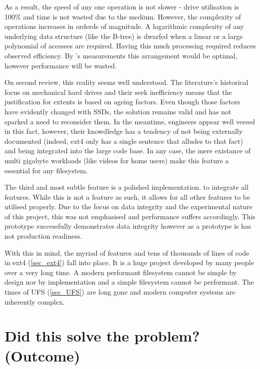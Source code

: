         As a result, the speed of any one operation is not slower - drive
        utilisation is 100\% and time is not wasted due to the medium. However,
        the complexity of operations increases in orderds of magnitude. A
        logarithmic complexity of any underlying data structure (like the
        B-tree) is dwarfed when a linear or a large polynomial of accesses are
        required. Having this much processing required reduces observed
        efficiency. By \citeauthor{FFS}'s measurements this arrangement would
        be optimal, however performance will be wasted.

        On second review, this reality seems well understood. The literature's
        historical focus on mechanical hard drives and their seek inefficiency
        means that the justification for extents is based on ageing factors.
        Even though those factors have evidently changed with SSDs, the
        solution remains valid and has not sparked a need to reconsider them.
        In the meantime, engineers appear well versed in this fact, however,
        their knowdledge has a tendency of not being externally documented
        (indeed, ext4 only has a single sentence that alludes to that fact) and
        being integrated into the large code base. In any case, the mere
        existance of multi gigabyte workloads (like videos for home users) make
        this feature a essential for any filesystem.

        The third and most subtle feature is a polished implementation.  to
        integrate all features. While this is not a feature as such, it allows
        for all other features to be utilised properly. Due to the focus on
        data integrity and the experimental nature of this project, this was
        not emphasised and performance suffers accordingly. This prototype
        successfully demonstrates data integrity however as a prototype is has
        not production readiness.

        With this in mind, the myriad of features and tens of thousands of
        lines of code in ext4 (\ref{sec_ext4}) fall into place. It is a huge
        project developed by many people over a very long time. A modern
        performant filesystem cannot be simple by design nor by implementation
        and a simple filesystem cannot be performant. The times of UFS
        (\ref{sec_UFS}) are long gone and modern computer systems are
        inherently complex.

    \section{Did this solve the problem? (Outcome)}

